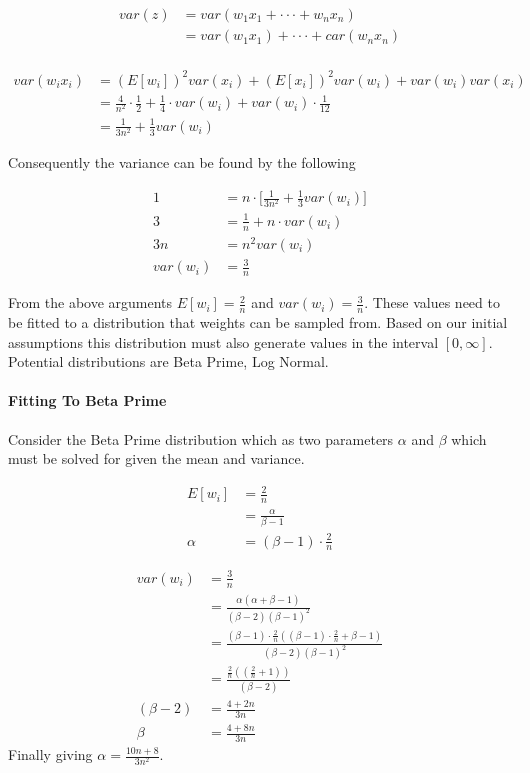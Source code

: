 \begin{align*}
	var(z) &= var(w_1x_1 + \cdot \cdot \cdot + w_nx_n)\\
	&= var(w_1x_1) + \cdot \cdot \cdot + car(w_nx_n)\\
\end{align*}

\begin{align*}
	var(w_ix_i) &= (E[w_i])^2var(x_i) + (E[x_i])^2var(w_i) + var(w_i)var(x_i)\\
	&= \frac{4}{n^2} \cdot \frac{1}{2} + \frac{1}{4} \cdot var(w_i) + var(w_i) \cdot \frac{1}{12}\\
	&= \frac{1}{3 n^2} + \frac{1}{3}var(w_i)
\end{align*}

Consequently the variance can be found by the following

\begin{align*}
	1 &= n \cdot \big[\frac{1}{3 n^2} + \frac{1}{3}var(w_i)\big]\\
	3 &= \frac{1}{n} + n \cdot var(w_i)\\
	3n &= n^2 var(w_i)\\
	var(w_i) &= \frac{3}{n}
\end{align*}

From the above arguments $E[w_i] = \frac{2}{n}$ and $var(w_i) = \frac{3}{n}$. These values need to be fitted to a distribution that weights can be sampled from. Based on our initial assumptions this distribution must also generate values in the interval $[0, \infty]$. Potential distributions are  Beta Prime, Log Normal.

\paragraph{Fitting To Beta Prime} Consider the Beta Prime distribution which as two parameters $\alpha$ and $\beta$ which must be solved for given the mean and variance.

\begin{align*}
	E[w_i] &= \frac{2}{n}\\
	&= \frac{\alpha}{\beta - 1}\\
	\alpha &= (\beta - 1) \cdot \frac{2}{n}
\end{align*}

\begin{align*}
	var(w_i) &= \frac{3}{n}\\
	&= \frac{\alpha (\alpha + \beta - 1)}{(\beta - 2)(\beta - 1)^2}\\
	&= \frac{(\beta - 1) \cdot \frac{2}{n} ((\beta - 1) \cdot \frac{2}{n} + \beta - 1)}{(\beta - 2)(\beta - 1)^2}\\
	&= \frac{\frac{2}{n} ((\frac{2}{n} + 1))}{(\beta - 2)}\\
	(\beta - 2) &= \frac{4 + 2n}{3n}\\
	\beta &= \frac{4 + 8n}{3n}
\end{align*}
Finally giving $\alpha = \frac{10n + 8}{3n^2}$.

